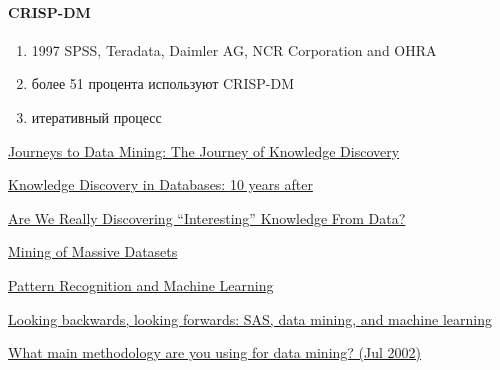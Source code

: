\documentclass[10pt,a4paper]{article}
\begin{document}
\paragraph{CRISP-DM} \cite{crisp}

\begin{enumerate}
\item 1997 SPSS, Teradata, Daimler AG, NCR Corporation and OHRA
\item более 51 процента используют CRISP-DM
\item итеративный процесс
\end{enumerate}


\begin{thebibliography}{10} 

 \href{http://citeseerx.ist.psu.edu/viewdoc/download?doi=10.1.1.363.1177&rep=rep1&type=pdf}{Journeys to Data Mining: The Journey of Knowledge Discovery}

 \href{http://www.kdnuggets.com/gpspubs/sigkdd-explorations-kdd-10-years.html}{Knowledge Discovery in Databases: 10 years after}

 \href{http://www.pantaneto.co.uk/issue30/Freitas.htm}{Are We Really Discovering ``Interesting'' Knowledge From Data?}

 \href{http://infolab.stanford.edu/~ullman/mmds/book.pdf}{Mining of Massive Datasets}

 \href{http://www.rmki.kfki.hu/~banmi/elte/Bishop\%20-\%20Pattern\%20Recognition\%20and\%20Machine\%20Learning.pdf}{Pattern Recognition and Machine Learning}

 \href{http://blogs.sas.com/content/subconsciousmusings/2014/08/22/looking-backwards-looking-forwards-sas-data-mining-and-machine-learning/}{Looking backwards, looking forwards: SAS, data mining, and machine learning}

 \href{http://www.kdnuggets.com/polls/2002/methodology.htm}{What main methodology are you using for data mining? (Jul 2002)}


\end{thebibliography}
\end{document}
